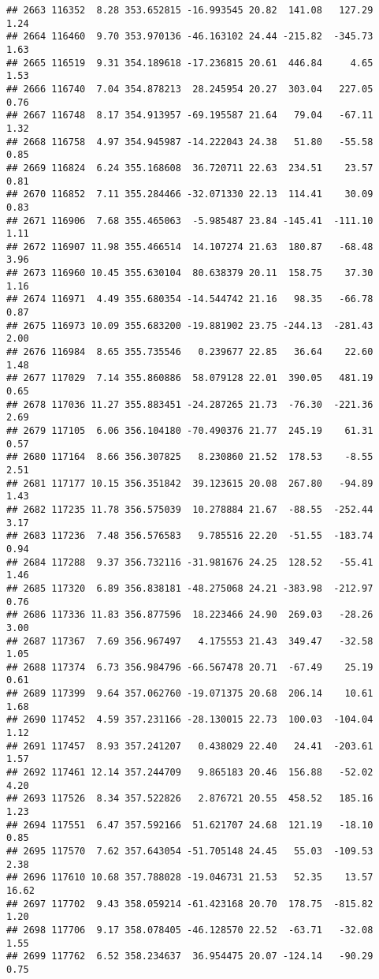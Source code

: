 \documentclass[]{article}
\begin{document}
\begin{verbatim}
## 2663 116352  8.28 353.652815 -16.993545 20.82  141.08   127.29  1.24
## 2664 116460  9.70 353.970136 -46.163102 24.44 -215.82  -345.73  1.63
## 2665 116519  9.31 354.189618 -17.236815 20.61  446.84     4.65  1.53
## 2666 116740  7.04 354.878213  28.245954 20.27  303.04   227.05  0.76
## 2667 116748  8.17 354.913957 -69.195587 21.64   79.04   -67.11  1.32
## 2668 116758  4.97 354.945987 -14.222043 24.38   51.80   -55.58  0.85
## 2669 116824  6.24 355.168608  36.720711 22.63  234.51    23.57  0.81
## 2670 116852  7.11 355.284466 -32.071330 22.13  114.41    30.09  0.83
## 2671 116906  7.68 355.465063  -5.985487 23.84 -145.41  -111.10  1.11
## 2672 116907 11.98 355.466514  14.107274 21.63  180.87   -68.48  3.96
## 2673 116960 10.45 355.630104  80.638379 20.11  158.75    37.30  1.16
## 2674 116971  4.49 355.680354 -14.544742 21.16   98.35   -66.78  0.87
## 2675 116973 10.09 355.683200 -19.881902 23.75 -244.13  -281.43  2.00
## 2676 116984  8.65 355.735546   0.239677 22.85   36.64    22.60  1.48
## 2677 117029  7.14 355.860886  58.079128 22.01  390.05   481.19  0.65
## 2678 117036 11.27 355.883451 -24.287265 21.73  -76.30  -221.36  2.69
## 2679 117105  6.06 356.104180 -70.490376 21.77  245.19    61.31  0.57
## 2680 117164  8.66 356.307825   8.230860 21.52  178.53    -8.55  2.51
## 2681 117177 10.15 356.351842  39.123615 20.08  267.80   -94.89  1.43
## 2682 117235 11.78 356.575039  10.278884 21.67  -88.55  -252.44  3.17
## 2683 117236  7.48 356.576583   9.785516 22.20  -51.55  -183.74  0.94
## 2684 117288  9.37 356.732116 -31.981676 24.25  128.52   -55.41  1.46
## 2685 117320  6.89 356.838181 -48.275068 24.21 -383.98  -212.97  0.76
## 2686 117336 11.83 356.877596  18.223466 24.90  269.03   -28.26  3.00
## 2687 117367  7.69 356.967497   4.175553 21.43  349.47   -32.58  1.05
## 2688 117374  6.73 356.984796 -66.567478 20.71  -67.49    25.19  0.61
## 2689 117399  9.64 357.062760 -19.071375 20.68  206.14    10.61  1.68
## 2690 117452  4.59 357.231166 -28.130015 22.73  100.03  -104.04  1.12
## 2691 117457  8.93 357.241207   0.438029 22.40   24.41  -203.61  1.57
## 2692 117461 12.14 357.244709   9.865183 20.46  156.88   -52.02  4.20
## 2693 117526  8.34 357.522826   2.876721 20.55  458.52   185.16  1.23
## 2694 117551  6.47 357.592166  51.621707 24.68  121.19   -18.10  0.85
## 2695 117570  7.62 357.643054 -51.705148 24.45   55.03  -109.53  2.38
## 2696 117610 10.68 357.788028 -19.046731 21.53   52.35    13.57 16.62
## 2697 117702  9.43 358.059214 -61.423168 20.70  178.75  -815.82  1.20
## 2698 117706  9.17 358.078405 -46.128570 22.52  -63.71   -32.08  1.55
## 2699 117762  6.52 358.234637  36.954475 20.07 -124.14   -90.29  0.75

\end{verbatim}
\end{document}
